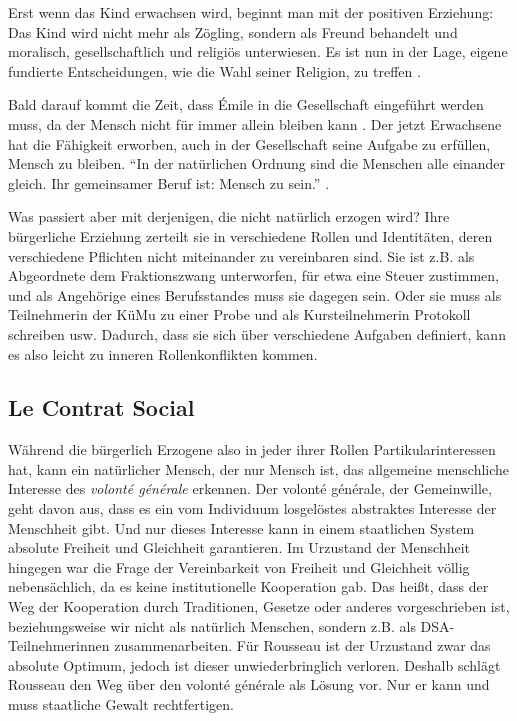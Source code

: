 Erst wenn das Kind erwachsen wird, beginnt man mit der positiven Erziehung:
Das Kind wird nicht mehr als Zögling, sondern als Freund behandelt und moralisch, gesellschaftlich und religiös unterwiesen.
Es ist nun in der Lage, eigene fundierte Entscheidungen, wie die Wahl seiner Religion, zu treffen \parencite[60f.]{rousseau-1762}.

Bald darauf kommt die Zeit, dass Émile in die Gesellschaft eingeführt werden muss, da der Mensch nicht für immer allein bleiben kann \parencite[61]{rousseau-1762}.
Der jetzt Erwachsene hat die Fähigkeit erworben, auch in der Gesellschaft seine Aufgabe zu erfüllen, Mensch zu bleiben.
``In der natürlichen Ordnung sind die Menschen alle einander gleich. Ihr gemeinsamer Beruf ist: Mensch zu sein.''
\parencite[50]{rousseau-1762}.

Was passiert aber mit derjenigen, die nicht natürlich erzogen wird?
Ihre bürgerliche Erziehung zerteilt sie in verschiedene Rollen und Identitäten, deren verschiedene Pflichten nicht miteinander zu vereinbaren sind.
Sie ist z.B. als Abgeordnete dem Fraktionszwang unterworfen, für etwa eine Steuer zustimmen, und als Angehörige eines Berufsstandes muss sie dagegen sein.
Oder sie muss als Teilnehmerin der KüMu zu einer Probe und als Kursteilnehmerin Protokoll schreiben usw.
Dadurch, dass sie sich über verschiedene Aufgaben definiert, kann es also leicht zu inneren Rollenkonflikten kommen.


\subsection{Le Contrat Social}

Während die bürgerlich Erzogene also in jeder ihrer Rollen Partikularinteressen hat, kann ein natürlicher Mensch, der nur Mensch ist, das allgemeine menschliche Interesse des \emph{volonté générale} erkennen.
Der volonté générale, der Gemeinwille, geht davon aus, dass es ein vom Individuum losgelöstes abstraktes Interesse der Menschheit gibt.
Und nur dieses Interesse kann in einem staatlichen System absolute Freiheit und Gleichheit garantieren.
Im Urzustand der Menschheit hingegen war die Frage der Vereinbarkeit von Freiheit und Gleichheit völlig nebensächlich, da es keine institutionelle Kooperation gab.
Das heißt, dass der Weg der Kooperation durch Traditionen, Gesetze oder anderes vorgeschrieben ist, beziehungsweise wir nicht als natürlich Menschen, sondern z.B. als DSA-Teilnehmerinnen zusammenarbeiten.
Für Rousseau ist der Urzustand zwar das absolute Optimum, jedoch ist dieser unwiederbringlich verloren.
Deshalb schlägt Rousseau den Weg über den volonté générale als Lösung vor.
Nur er kann und muss staatliche Gewalt rechtfertigen.

